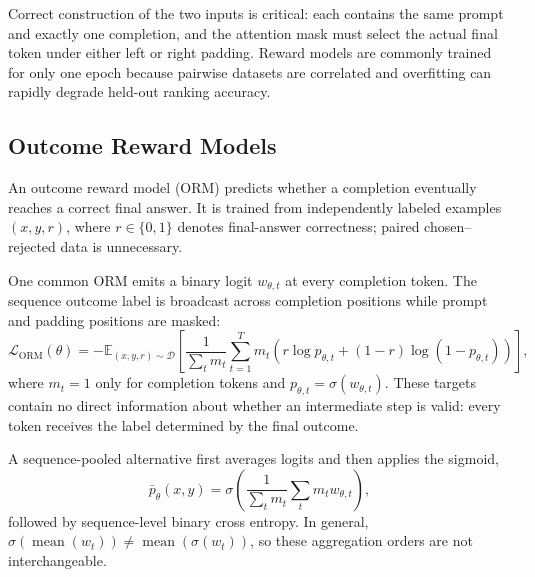 Correct construction of the two inputs is critical: each contains the same
prompt and exactly one completion, and the attention mask must select the
actual final token under either left or right padding.  Reward models are
commonly trained for only one epoch because pairwise datasets are correlated
and overfitting can rapidly degrade held-out ranking accuracy.

\subsection{Outcome Reward Models}

An outcome reward model (ORM) predicts whether a completion eventually reaches
a correct final answer.  It is trained from independently labeled examples
$(x,y,r)$, where $r\in\{0,1\}$ denotes final-answer correctness; paired
chosen--rejected data is unnecessary.

One common ORM emits a binary logit $w_{\theta,t}$ at every completion token.
The sequence outcome label is broadcast across completion positions while
prompt and padding positions are masked:
\begin{equation}
    \mathcal{L}_{\mathrm{ORM}}(\theta)
    =
    -\mathbb{E}_{(x,y,r)\sim\mathcal{D}}
    \left[
        \frac{1}{\sum_t m_t}
        \sum_{t=1}^{T}m_t
        \left(
            r\log p_{\theta,t}
            +(1-r)\log(1-p_{\theta,t})
        \right)
    \right],
    \label{eq:orm-token-loss}
\end{equation}
where $m_t=1$ only for completion tokens and
$p_{\theta,t}=\sigma(w_{\theta,t})$.  These targets contain no direct
information about whether an intermediate step is valid: every token receives
the label determined by the final outcome.

A sequence-pooled alternative first averages logits and then applies the
sigmoid,
\begin{equation}
    \bar p_\theta(x,y)
    =
    \sigma\!\left(
        \frac{1}{\sum_t m_t}\sum_t m_t w_{\theta,t}
    \right),
\end{equation}
followed by sequence-level binary cross entropy.  In general,
$\sigma(\operatorname{mean}(w_t))\neq
\operatorname{mean}(\sigma(w_t))$, so these aggregation orders are not
interchangeable.

